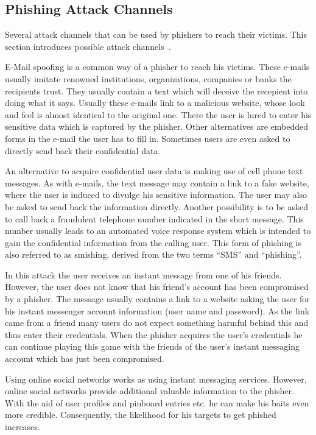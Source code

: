 \subsection{Phishing Attack Channels}
Several attack channels that can be used by phishers to reach their victims. This section introduces possible attack channels~\cite{phishing2010ramazan}.
\label{s:attack_channels}
\begin{description}[leftmargin=0cm]
	\item[E-Mail] E-Mail spoofing is a common way of a phisher to reach his victims. These e-mails usually imitate renowned institutions, organizations, companies or banks the recipients trust. They usually contain a text which will deceive the recepient into doing what it says. Usually these e-mails link to a malicious website, whose look and feel is almost identical to the original one. There the user is lured to enter his sensitive data which is captured by the phisher. Other alternatives are embedded forms in the e-mail the user has to fill in. Sometimes users are even asked to directly send back their confidential data.
	\item[SMS] An alternative to acquire confidential user data is making use of cell phone text messages. As with e-mails, the text message may contain a link to a fake website, where the user is induced to divulge his sensitive information. The user may also be asked to send back the information directly. Another possibility is to be asked to call back a fraudulent telephone number indicated in the short message. This number usually leads to an automated voice response system which is intended to gain the confidential information from the calling user. This form of phishing is also referred to as smishing, derived from the two terms ``SMS'' and ``phishing''.
	\item[Instant Messaging] In this attack the user receives an instant message from one of his friends. However, the user does not know that his friend's account has been compromised by a phisher. The message usually contains a link to a website asking the user for his instant messenger account information (user name and password). As the link came from a friend many users do not expect something harmful behind this and thus enter their credentials. When the phisher acquires the user's credentials he can continue playing this game with the friends of the user's instant messaging account which has just been compromised.
	\item[Online Social Networks] Using online social networks works as using instant messaging services. However, online social networks provide additional valuable information to the phisher. With the aid of user profiles and pinboard entries etc. he can make his baits even more credible. Consequently, the likelihood for his targets to get phished increases.

\end{description}
